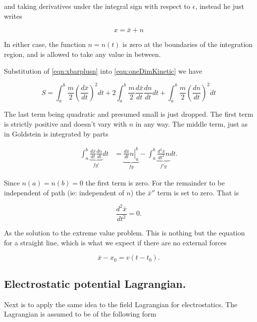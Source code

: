 \documentclass{article}
\begin{document}
and taking derivatives under the integral sign with respect to $\epsilon$, instead he just writes

\begin{equation}\label{eqn:xbarplusn}
x = \bar{x} + n
\end{equation}

In either case, the function $n = n(t)$ is zero at the boundaries of the integration region, and is allowed to take any value in between.

Substitution of \ref{eqn:xbarplusn} into \ref{eqn:oneDimKinetic} we have

\begin{equation}
S = 
\int_a^b \frac{m}{2} { \left(\frac{d\bar{x}}{dt}\right) }^2 dt
+ 2 \int_a^b \frac{m}{2} \frac{d\bar{x}}{dt} \frac{d n}{dt} dt
+ \int_a^b \frac{m}{2} { \left(\frac{d n}{dt}\right) }^2 dt
\end{equation}

The last term being quadratic and presumed small is just dropped.  The first term is strictly positive and doesn't vary with $n$ in any way.  The middle term, just as in 
Goldstein is integrated by parts

\begin{align*}
\int_a^b \underbrace{ \frac{d\bar{x}}{dt} \frac{d n}{dt} }_{fg'} dt
&= \underbrace{ \left. \frac{d\bar{x}}{dt} n \right\vert_a^b }_{fg} - \int_a^b \underbrace{\frac{d^2\bar{x}}{dt^2} n}_{f'g} dt.
\end{align*}

Since $n(a) = n(b) = 0$ the first term is zero.  For the remainder to be independent of path (ie: independent of $n$) the $\bar{x}''$ term is set to zero.  That is

\begin{equation*}
\frac{d^2\bar{x}}{dt^2} = 0.
\end{equation*}

As the solution to the extreme value problem.  This is nothing but the equation for a straight line, which is what we expect if there are no external forces

\begin{equation*}
\bar{x} - x_0 = v(t - t_0).
\end{equation*}

\subsection{ Electrostatic potential Lagrangian. }

Next is to apply the same idea to the field Lagrangian for electrostatics.  The Lagrangian is assumed to be of the following form
\end{document}
